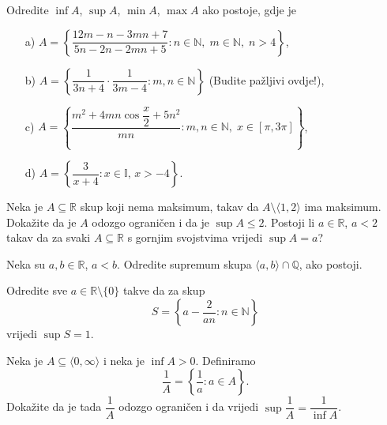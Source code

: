 \begin{exercise}
Odredite $\inf{A}$, $\sup{A}$, $\min{A}$, $\max{A}$ ako postoje, gdje je
\begin{itemize}
\item[a)] $A=\left\{\dfrac{12m-n-3mn+7}{5n-2n-2mn+5} : n\in \mathbb{N},\; m\in \mathbb{N},\; n>4\right\}$,
\item[b)] $A=\left\{\dfrac{1}{3n+4}\cdot \dfrac{1}{3m-4} : m, n\in \mathbb{N}\right\}$ (Budite pažljivi ovdje!),
\item[c)] $A=\left\{\dfrac{m^2+4mn\cos{\dfrac{x}{2}}+5n^2}{mn} : m, n\in \mathbb{N},\; x\in [\pi, 3\pi]\right\}$,
\item[d)] $A=\left\{\dfrac{3}{x+4} : x\in \mathbb{I},\, x>-4\right\}$.
\end{itemize}
\end{exercise}
\begin{exercise}
Neka je $A\subseteq \mathbb{R}$ skup koji nema maksimum, takav da $A\setminus\langle 1, 2\rangle$ ima maksimum. Dokažite da je $A$ odozgo ograničen i da je $\sup{A}\leq 2$. Postoji li $a\in \mathbb{R}$, $a<2$ takav da za svaki $A\subseteq \mathbb{R}$ s gornjim svojstvima vrijedi $\sup{A}=a$?
\end{exercise}
\begin{exercise}
Neka su $a, b\in \mathbb{R}$, $a<b$. Odredite supremum skupa $\langle a, b\rangle\cap \mathbb{Q}$, ako postoji.
\end{exercise}
\begin{exercise}
Odredite sve $a\in \mathbb{R}\setminus\{0\}$ takve da za skup
$$S=\left\{a-\dfrac{2}{an} : n\in \mathbb{N}\right\}$$
vrijedi $\sup{S}=1$.
\end{exercise}
\begin{exercise}
Neka je $A\subseteq \langle 0,\infty\rangle$ i neka je $\inf{A}>0$. Definiramo
$$\dfrac{1}{A}=\left\{\dfrac{1}{a} : a\in A\right\}.$$
Dokažite da je tada $\dfrac{1}{A}$ odozgo ograničen i da vrijedi
$\sup{\dfrac{1}{A}}=\dfrac{1}{\inf{A}}$.
\end{exercise}
